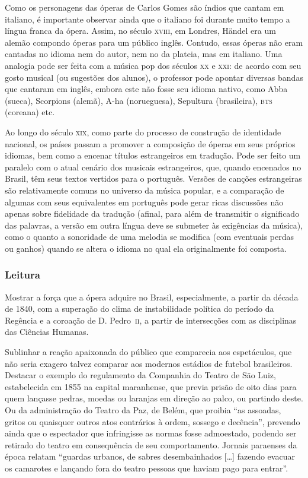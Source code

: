 \documentclass[11pt]{extarticle}
\begin{document}
Como os personagens das óperas de Carlos Gomes são índios que cantam em
italiano, é importante observar ainda que o italiano foi durante muito tempo a
língua franca da ópera. Assim, no século \textsc{xviii}, em Londres, Händel era um
alemão compondo óperas para um público inglês. Contudo, essas óperas não eram
cantadas no idioma nem do autor, nem no da plateia, mas em italiano. Uma
analogia pode ser feita com a música pop dos séculos \textsc{xx} e \textsc{xxi}: de acordo com
seu gosto musical (ou sugestões dos alunos), o professor pode apontar diversas
bandas que cantaram em inglês, embora este não fosse seu idioma nativo, como
Abba (sueca), Scorpions (alemã), A-ha (norueguesa), Sepultura (brasileira), \textsc{bts}
(coreana) etc. 

Ao longo do século \textsc{xix}, como parte do processo de construção de identidade
nacional, os países passam a promover a composição de óperas em seus próprios
idiomas, bem como a encenar títulos estrangeiros em tradução. Pode ser feito um
paralelo com o atual cenário dos musicais estrangeiros, que, quando encenados
no Brasil, têm seus textos vertidos para o português. Versões de canções
estrangeiras são relativamente comuns no universo da música popular, e a
comparação de algumas com seus equivalentes em português pode gerar ricas
discussões não apenas sobre fidelidade da tradução (afinal, para além de
transmitir o significado das palavras, a versão em outra língua deve se
submeter às exigências da música), como o quanto a sonoridade de uma melodia se
modifica (com eventuais perdas ou ganhos) quando se altera o idioma no qual ela
originalmente foi composta. 

\subsubsection{Leitura}

Mostrar a força que a ópera adquire no Brasil, especialmente, a partir da
década de 1840, com a superação do clima de instabilidade política do período
da Regência e a coroação de D. Pedro~\textsc{ii}, a partir de intersecções com as disciplinas 
das Ciências Humanas.

Sublinhar a reação apaixonada do público que comparecia aos espetáculos, que
não seria exagero talvez comparar aos modernos estádios de futebol brasileiros.
Destacar o exemplo do regulamento da Companhia do Teatro de São Luiz,
estabelecida em 1855 na capital maranhense, que previa prisão de oito dias para
quem lançasse pedras, moedas ou laranjas em direção ao palco, ou partindo
deste. Ou da administração do Teatro da Paz, de Belém, que proibia ``as
assoadas, gritos ou quaisquer outros atos contrários à ordem, sossego e
decência'', prevendo ainda que o espectador que infringisse as normas fosse
admoestado, podendo ser retirado do teatro em consequência de seu
comportamento. Jornais paraenses da época relatam “guardas urbanos, de sabres
desembainhados […] fazendo evacuar os camarotes e lançando fora do teatro
pessoas que haviam pago para entrar”.
\end{document}
